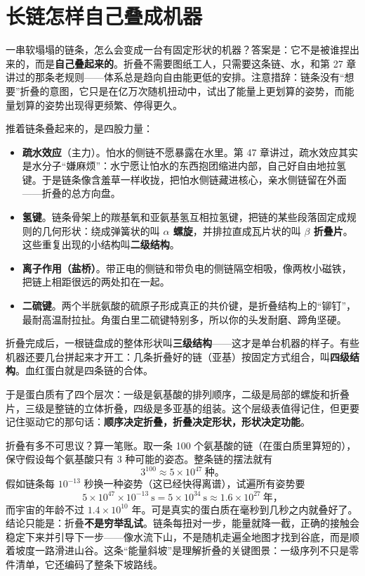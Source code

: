 \section{长链怎样自己叠成机器}

一串软塌塌的链条，怎么会变成一台有固定形状的机器？答案是：它不是被谁捏出来的，而是\textbf{自己叠起来的}。折叠不需要图纸工人，只需要这条链、水，和第 27 章讲过的那条老规则——体系总是趋向自由能更低的安排。注意措辞：链条没有“想要”折叠的意图，它只是在亿万次随机扭动中，试出了能量上更划算的姿势，而能量划算的姿势出现得更频繁、停得更久。

推着链条叠起来的，是四股力量：

\begin{itemize}[itemsep=2pt]
\item \textbf{疏水效应}（主力）。怕水的侧链不愿暴露在水里。第 47 章讲过，疏水效应其实是水分子“嫌麻烦”：水宁愿让怕水的东西抱团缩进内部，自己好自由地拉氢键。于是链条像含羞草一样收拢，把怕水侧链藏进核心，亲水侧链留在外面——折叠的总方向盘。
\item \textbf{氢键}。链条骨架上的羰基氧和亚氨基氢互相拉氢键，把链的某些段落固定成规则的几何形状：绕成弹簧状的叫 \textbf{$\alpha$ 螺旋}，并排拉直成瓦片状的叫 \textbf{$\beta$ 折叠片}。这些重复出现的小结构叫\textbf{二级结构}。
\item \textbf{离子作用（盐桥）}。带正电的侧链和带负电的侧链隔空相吸，像两枚小磁铁，把链上相距很远的两处扣在一起。
\item \textbf{二硫键}。两个半胱氨酸的硫原子形成真正的共价键，是折叠结构上的“铆钉”，最耐高温耐拉扯。角蛋白里二硫键特别多，所以你的头发耐磨、蹄角坚硬。
\end{itemize}

折叠完成后，一根链盘成的整体形状叫\textbf{三级结构}——这才是单台机器的样子。有些机器还要几台拼起来才开工：几条折叠好的链（亚基）按固定方式组合，叫\textbf{四级结构}。血红蛋白就是四条链的合体。

于是蛋白质有了四个层次：一级是氨基酸的排列顺序，二级是局部的螺旋和折叠片，三级是整链的立体折叠，四级是多亚基的组装。这个层级表值得记住，但更要记住驱动它的那句话：\textbf{顺序决定折叠，折叠决定形状，形状决定功能}。

\begin{qiaoliang}
折叠有多不可思议？算一笔账。取一条 100 个氨基酸的链（在蛋白质里算短的），保守假设每个氨基酸只有 3 种可能的姿态。整条链的摆法就有
\[3^{100} \approx 5\times 10^{47}\ \text{种。}\]
假如链条每 $10^{-13}$ 秒换一种姿势（这已经快得离谱），试遍所有姿势要
\[5\times 10^{47}\times 10^{-13}\ \mathrm{s}=5\times 10^{34}\ \mathrm{s}\approx 1.6\times 10^{27}\ \text{年，}\]
而宇宙的年龄不过 $1.4\times 10^{10}$ 年。可是真实的蛋白质在毫秒到几秒之内就叠好了。结论只能是：折叠\textbf{不是穷举乱试}。链条每扭对一步，能量就降一截，正确的接触会稳定下来并引导下一步——像水流下山，不是随机走遍全地图才找到谷底，而是顺着坡度一路滑进山谷。这条“能量斜坡”是理解折叠的关键图景：一级序列不只是零件清单，它还编码了整条下坡路线。
\end{qiaoliang}

